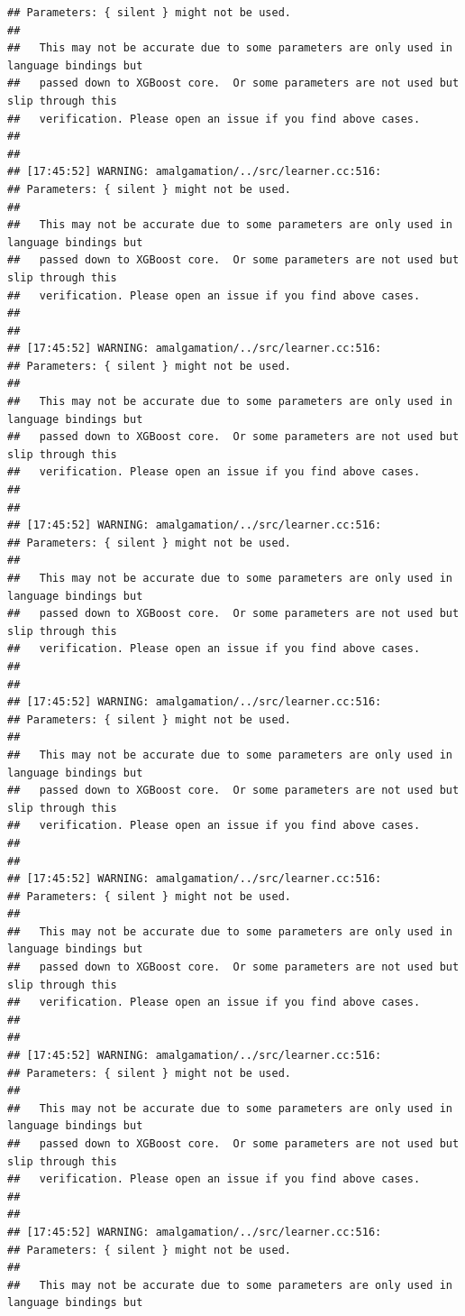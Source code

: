 \documentclass[AMS,STIX2COL]{WileyNJD-v2}\usepackage[]{graphicx}\usepackage[]{color}
\makeatletter
\newenvironment{kframe}{%
 \def\at@end@of@kframe{}%
 \ifinner\ifhmode%
  \def\at@end@of@kframe{\end{minipage}}%
  \begin{minipage}{\columnwidth}%
 \fi\fi%
 \def\FrameCommand##1{\hskip\@totalleftmargin \hskip-\fboxsep
 \colorbox{shadecolor}{##1}\hskip-\fboxsep
     \hskip-\linewidth \hskip-\@totalleftmargin \hskip\columnwidth}%
 \MakeFramed {\advance\hsize-\width
   \@totalleftmargin\z@ \linewidth\hsize
   \@setminipage}}%
 {\par\unskip\endMakeFramed%
 \at@end@of@kframe}
\newenvironment{knitrout}{}{} %
\makeatother
\begin{document}
\begin{knitrout}
\begin{kframe}
\begin{verbatim}
## Parameters: { silent } might not be used.
## 
##   This may not be accurate due to some parameters are only used in language bindings but
##   passed down to XGBoost core.  Or some parameters are not used but slip through this
##   verification. Please open an issue if you find above cases.
## 
## 
## [17:45:52] WARNING: amalgamation/../src/learner.cc:516: 
## Parameters: { silent } might not be used.
## 
##   This may not be accurate due to some parameters are only used in language bindings but
##   passed down to XGBoost core.  Or some parameters are not used but slip through this
##   verification. Please open an issue if you find above cases.
## 
## 
## [17:45:52] WARNING: amalgamation/../src/learner.cc:516: 
## Parameters: { silent } might not be used.
## 
##   This may not be accurate due to some parameters are only used in language bindings but
##   passed down to XGBoost core.  Or some parameters are not used but slip through this
##   verification. Please open an issue if you find above cases.
## 
## 
## [17:45:52] WARNING: amalgamation/../src/learner.cc:516: 
## Parameters: { silent } might not be used.
## 
##   This may not be accurate due to some parameters are only used in language bindings but
##   passed down to XGBoost core.  Or some parameters are not used but slip through this
##   verification. Please open an issue if you find above cases.
## 
## 
## [17:45:52] WARNING: amalgamation/../src/learner.cc:516: 
## Parameters: { silent } might not be used.
## 
##   This may not be accurate due to some parameters are only used in language bindings but
##   passed down to XGBoost core.  Or some parameters are not used but slip through this
##   verification. Please open an issue if you find above cases.
## 
## 
## [17:45:52] WARNING: amalgamation/../src/learner.cc:516: 
## Parameters: { silent } might not be used.
## 
##   This may not be accurate due to some parameters are only used in language bindings but
##   passed down to XGBoost core.  Or some parameters are not used but slip through this
##   verification. Please open an issue if you find above cases.
## 
## 
## [17:45:52] WARNING: amalgamation/../src/learner.cc:516: 
## Parameters: { silent } might not be used.
## 
##   This may not be accurate due to some parameters are only used in language bindings but
##   passed down to XGBoost core.  Or some parameters are not used but slip through this
##   verification. Please open an issue if you find above cases.
## 
## 
## [17:45:52] WARNING: amalgamation/../src/learner.cc:516: 
## Parameters: { silent } might not be used.
## 
##   This may not be accurate due to some parameters are only used in language bindings but

\end{verbatim}
\end{kframe}
\end{knitrout}
\end{document}
